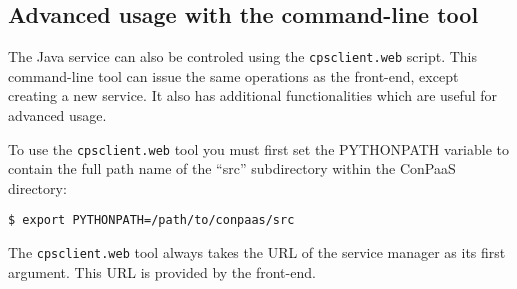 \documentclass[10pt]{article}
\begin{document}
\subsection{Advanced usage with the command-line tool}

The Java service can also be controled using the \texttt{cpsclient.web}
script. This command-line tool can issue the same operations as the
front-end, except creating a new service. It also has additional
functionalities which are useful for advanced usage.

To use the \texttt{cpsclient.web} tool you must first set the
PYTHONPATH variable to contain the full path name of the ``src''
subdirectory within the ConPaaS directory:
\begin{verbatim}
$ export PYTHONPATH=/path/to/conpaas/src
\end{verbatim}

The \texttt{cpsclient.web} tool always takes the URL of the service
manager as its first argument. This URL is provided by the front-end.

\vspace{1em}
\end{document}
